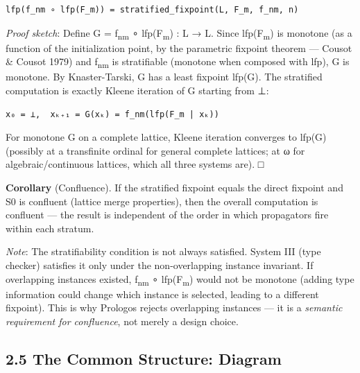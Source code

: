 \documentclass[11pt]{article}
\begin{document}
\begin{verbatim}
lfp(f_nm ∘ lfp(F_m)) = stratified_fixpoint(L, F_m, f_nm, n)
\end{verbatim}

\emph{Proof sketch}: Define G = f\textsubscript{nm} ∘ lfp(F\textsubscript{m}) : L → L. Since lfp(F\textsubscript{m}) is
monotone (as a function of the initialization point, by the parametric fixpoint
theorem — Cousot \& Cousot 1979) and f\textsubscript{nm} is stratifiable (monotone when composed
with lfp), G is monotone. By Knaster-Tarski, G has a least fixpoint lfp(G).
The stratified computation is exactly Kleene iteration of G starting from ⊥:

\begin{verbatim}
x₀ = ⊥,  xₖ₊₁ = G(xₖ) = f_nm(lfp(F_m | xₖ))
\end{verbatim}

For monotone G on a complete lattice, Kleene iteration converges to lfp(G)
(possibly at a transfinite ordinal for general complete lattices; at ω for
algebraic/continuous lattices, which all three systems are). □

\textbf{Corollary} (Confluence). If the stratified fixpoint equals the direct fixpoint
and S0 is confluent (lattice merge properties), then the overall computation is
confluent — the result is independent of the order in which propagators fire
within each stratum.

\emph{Note}: The stratifiability condition is not always satisfied. System III (type
checker) satisfies it only under the non-overlapping instance invariant. If
overlapping instances existed, f\textsubscript{nm} ∘ lfp(F\textsubscript{m}) would not be monotone (adding
type information could change which instance is selected, leading to a different
fixpoint). This is why Prologos rejects overlapping instances — it is a
\emph{semantic requirement for confluence}, not merely a design choice.
\subsection{2.5 The Common Structure: Diagram}
\label{sec:org75e2a55}
\end{document}
